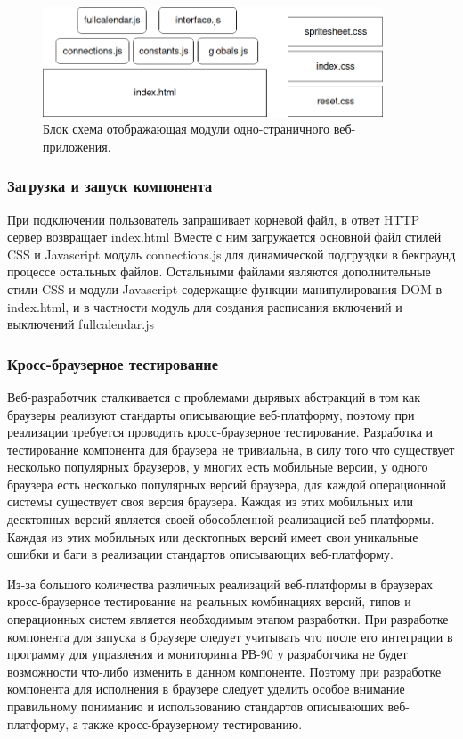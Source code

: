 \begin{figure}[h!]
    \centering
    \includegraphics[width=0.9\textwidth]{webapp_modules_blocks.png}
    \caption{Блок схема отображающая модули одно-страничного веб-приложения.}
\end{figure}

\subsubsection{ Загрузка и запуск компонента}
При подключении пользователь запрашивает корневой файл, в ответ HTTP сервер возвращает index.html
Вместе с ним загружается основной файл стилей CSS и Javascript модуль connections.js для динамической подгруздки в бекграунд процессе остальных файлов. Остальными файлами являются дополнительные стили CSS и модули Javascript содержащие функции манипулирования DOM в index.html, и в частности модуль для создания расписания включений и выключений fullcalendar.js  

\subsubsection{ Кросс-браузерное тестирование}
Веб-разработчик сталкивается с проблемами дырявых абстракций в том как браузеры реализуют стандарты описывающие веб-платформу, поэтому при реализации требуется проводить кросс-браузерное тестирование.
Разработка и тестирование компонента для браузера не тривиальна, в силу того что 
существует несколько популярных браузеров, у многих есть мобильные версии, у одного браузера есть несколько популярных версий браузера, для каждой операционной системы существует своя версия браузера. Каждая из этих мобильных или десктопных версий является своей обособленной реализацией веб-платформы. Каждая из этих мобильных или десктопных версий имеет свои уникальные ошибки и баги в реализации стандартов описывающих веб-платформу. 

Из-за большого количества различных реализаций веб-платформы в браузерах кросс-браузерное тестирование на реальных комбинациях версий, типов и операционных систем является необходимым этапом разработки. При разработке компонента для запуска в браузере следует учитывать что после его интеграции в программу для управления и мониторинга РВ-90 у разработчика не будет возможности что-либо изменить в данном компоненте. Поэтому при разработке компонента для исполнения в браузере следует уделить особое внимание правильному пониманию и использованию стандартов описывающих веб-платформу, а также кросс-браузерному тестированию. 

